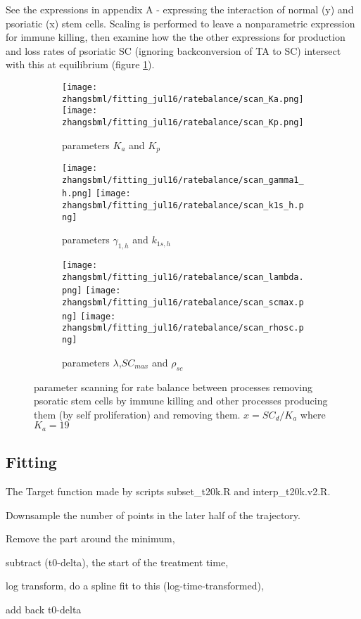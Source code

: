 \documentclass[a4paper,10pt]{report}
\newcommand{\psortbase}{/home/ngrs2/work/bsu/PSORT_Zuliani_Reynolds/}
\newcommand{\sbmlbase}{\psortbase/sbml-sh/}
\newcommand{\zhangsbml}{\sbmlbase/zhang_model}
\begin{document}
See the expressions in appendix A - expressing the interaction of 
normal (y) and psoriatic (x) stem cells. Scaling is performed to leave 
a nonparametric expression for immune killing, then examine how the the other expressions  for production and loss rates of psoriatic SC 
(ignoring backconversion of TA to SC) intersect with this at equilibrium
(figure \ref{fig:ratebal_sc_scd}). 

\begin{figure}[h!]
  \begin{subfigure}{\textwidth}
    \texttt{[image: \\zhangsbml/fitting\_jul16/ratebalance/scan\_Ka.png]}
    \texttt{[image: \\zhangsbml/fitting\_jul16/ratebalance/scan\_Kp.png]}
    \caption{parameters $K_a$ and $K_p$}
  \end{subfigure}
  \begin{subfigure}{\textwidth}
    \texttt{[image: \\zhangsbml/fitting\_jul16/ratebalance/scan\_gamma1\_h.png]}
    \texttt{[image: \\zhangsbml/fitting\_jul16/ratebalance/scan\_k1s\_h.png]}
    \caption{parameters $\gamma_{1,h}$ and $k_{1s,h}$}
  \end{subfigure}
  \begin{subfigure}{\textwidth}
    \texttt{[image: \\zhangsbml/fitting\_jul16/ratebalance/scan\_lambda.png]}
    \texttt{[image: \\zhangsbml/fitting\_jul16/ratebalance/scan\_scmax.png]}
    \texttt{[image: \\zhangsbml/fitting\_jul16/ratebalance/scan\_rhosc.png]}
    \caption{parameters $\lambda$,$SC_{max}$ and $\rho_{sc}$}
  \end{subfigure}
  \caption{parameter scanning for rate balance between processes removing psoratic stem cells by immune killing and other processes producing them (by self proliferation) and removing them. $x=SC_d/K_a$ where $K_a=19$}
  \label{fig:ratebal_sc_scd}
\end{figure}

    



\subsection{Fitting}\label{sec:zfitting}

The Target function made by scripts subset\_t20k.R and interp\_t20k.v2.R. 


\begin{description}
\item Downsample the number of points in the later half of the trajectory. 
\item Remove the part around the minimum, 
\item subtract (t0-delta), the start of the treatment time,
\item log transform, do a spline fit to this (log-time-transformed), 
\item add back t0-delta 
\end{description}
\end{document}
